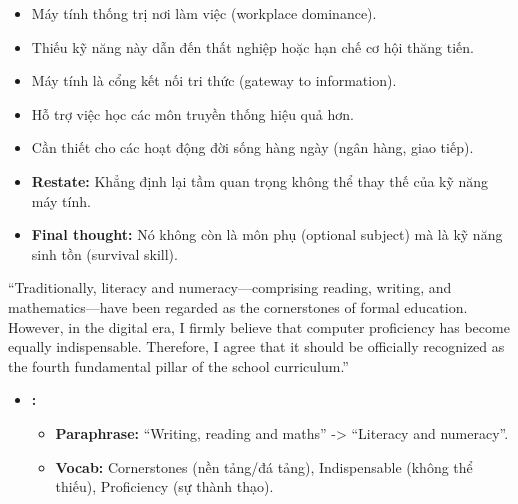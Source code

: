 \begin{itemize}
\tightlist
\item
  Máy tính thống trị nơi làm việc (workplace dominance).
\item
  Thiếu kỹ năng này dẫn đến thất nghiệp hoặc hạn chế cơ hội thăng tiến.
\end{itemize}


\begin{itemize}
\tightlist
\item
  Máy tính là cổng kết nối tri thức (gateway to information).
\item
  Hỗ trợ việc học các môn truyền thống hiệu quả hơn.
\item
  Cần thiết cho các hoạt động đời sống hàng ngày (ngân hàng, giao tiếp).
\end{itemize}


\begin{itemize}
\tightlist
\item
  \textbf{Restate:} Khẳng định lại tầm quan trọng không thể thay thế của
  kỹ năng máy tính.
\item
  \textbf{Final thought:} Nó không còn là môn phụ (optional subject) mà
  là kỹ năng sinh tồn (survival skill).
\end{itemize}



``Traditionally, literacy and numeracy---comprising reading, writing,
and mathematics---have been regarded as the cornerstones of formal
education. However, in the digital era, I firmly believe that computer
proficiency has become equally indispensable. Therefore, I agree that it
should be officially recognized as the fourth fundamental pillar of the
school curriculum.''

\begin{itemize}
\tightlist
\item
  \textbf{:}

  \begin{itemize}
  \tightlist
  \item
    \textbf{Paraphrase:} ``Writing, reading and maths'' -\textgreater{}
    ``Literacy and numeracy''.
  \item
    \textbf{Vocab:} Cornerstones (nền tảng/đá tảng), Indispensable
    (không thể thiếu), Proficiency (sự thành thạo).
  \end{itemize}
\end{itemize}

